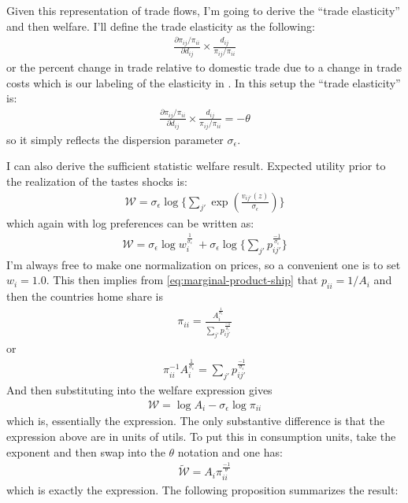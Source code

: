 \documentclass[12pt,pdftex]{article}
\begin{document}
\begin{onehalfspacing}
Given this representation of trade flows, I'm going to derive the ``trade elasticity'' and then welfare. I'll define the trade elasticity as the following:
\begin{align}
\frac{\partial \pi_{ij} / \pi_{ii}}{\partial d_{ij}} \times \frac{d_{ij}}{\pi_{ij} / \pi_{ii}}
\end{align}
or the percent change in trade relative to domestic trade due to a change in trade costs which is our labeling of the elasticity in \citet{simonovska2014elasticity}. In this setup the ``trade elasticity'' is:
\begin{align}
\frac{\partial \pi_{ij} / \pi_{ii}}{\partial d_{ij}} \times \frac{d_{ij}}{\pi_{ij} / \pi_{ii}} = -\theta
\end{align}
so it simply reflects the dispersion parameter $\sigma_{\epsilon}$.

I can also derive the \citet{arkolakis2012new} sufficient statistic welfare result. Expected utility  prior to the realization of the tastes shocks is:
\begin{align}
\mathcal{W} = \sigma_{\epsilon} \log \bigg \{ \sum_{j'} \exp \left( \frac{ v_{ij'}(z) }{\sigma_{\epsilon}} \right) \bigg \}
\end{align}
which again with log preferences can be written as:
\begin{align}
\mathcal{W} = \sigma_{\epsilon} \log w_{i}^{\frac{1}{\sigma_{\epsilon}}} \ + \sigma_{\epsilon} \log \bigg \{ \sum_{j'} p_{ij'}^{\frac{-1}{\sigma_{\epsilon}}} \bigg \}
\end{align}
I'm always free to make one normalization on prices, so a convenient one is to set $w_i = 1.0$. This then implies from \ref{eq:marginal-product-ship} that $p_{ii} = 1 / A_{i}$ and then the countries home share is
\begin{align}
\pi_{ii} = \frac{A_i^{\frac{1}{\sigma_{\epsilon}}}}{\sum_{j'} p_{ij'}^{\frac{-1}{\sigma_{\epsilon}}}}
\end{align}
or
\begin{align}
\pi_{ii}^{-1}A_i^{\frac{1}{\sigma_{\epsilon}}} = \sum_{j'} p_{ij'}^{\frac{-1}{\sigma_{\epsilon}}}
\end{align}
And then substituting into the welfare expression gives
\begin{align}
\mathcal{W} = \log A_{i}  - \sigma_{\epsilon} \log \pi_{ii}
\end{align}
which is, essentially the \citet{arkolakis2012new} expression. The only substantive difference is that the expression above are in units of utils. To put this in consumption units, take the exponent and then swap into the $\theta$ notation and one has:
\begin{align}
\mathcal{\tilde W} = A_{i} \pi_{ii}^{\frac{-1}{\theta}}
\end{align}
which is exactly the \citet{arkolakis2012new} expression. The following proposition summarizes the result:


\end{onehalfspacing}
\end{document}
